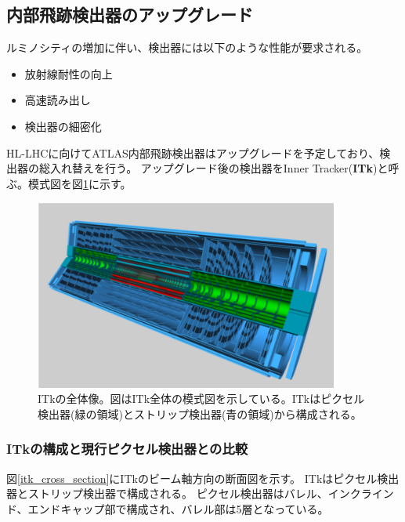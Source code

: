 \subsection{内部飛跡検出器のアップグレード}
ルミノシティの増加に伴い、検出器には以下のような性能が要求される。
\begin{itemize}
  \item 放射線耐性の向上
  \item 高速読み出し
  \item 検出器の細密化
\end{itemize}

HL-LHCに向けてATLAS内部飛跡検出器はアップグレードを予定しており、検出器の総入れ替えを行う。
アップグレード後の検出器をInner Tracker(\textbf{ITk})と呼ぶ。模式図を図\ref{itk_image}に示す。

\begin{figure}[bpt]\centering
\includegraphics[width=10cm]{itk_image}
\caption[ITkの全体像]{ITkの全体像\cite{1-3}。図はITk全体の模式図を示している。ITkはピクセル検出器(緑の領域)とストリップ検出器(青の領域)から構成される。}
\label{itk_image}
\end{figure}

\subsubsection{ITkの構成と現行ピクセル検出器との比較}
図\ref{itk_cross_section}にITkのビーム軸方向の断面図を示す。
ITkはピクセル検出器とストリップ検出器で構成される。
ピクセル検出器はバレル、インクラインド、エンドキャップ部で構成され、バレル部は5層となっている。


